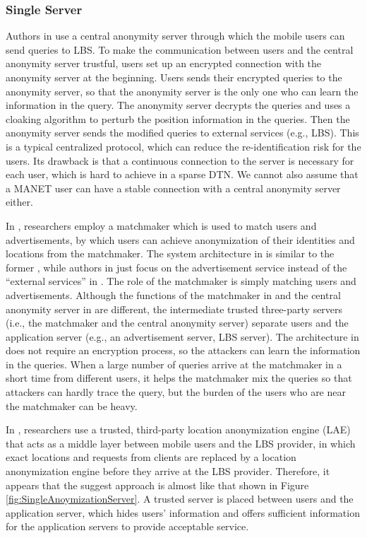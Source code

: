 \subsubsection{ Single Server}

\noindent Authors in \cite {C15} use a central anonymity server through which the mobile users can send queries to LBS. To make the communication between users and the central anonymity server trustful, users set up an encrypted connection with the anonymity server at the beginning. Users sends their encrypted queries to the anonymity server, so that the anonymity server is the only one who can learn the information in the query. The anonymity server decrypts the queries and uses a cloaking algorithm to perturb the position information in the queries. Then the anonymity server sends the modified queries to external services (e.g., LBS). This is a typical centralized protocol, which can reduce the re-identification risk for the users. Its drawback is that a continuous connection to the server is necessary for each user, which is hard to achieve in a sparse DTN. We cannot also assume that a MANET user can have a stable connection with a central anonymity server either.

In \cite {C23}, researchers employ a matchmaker which is used to match users and advertisements, by which users can achieve anonymization of their identities and locations from the matchmaker. The system architecture in \cite {C23} is similar to the former \cite {C15}, while authors in \cite {C23} just focus on the advertisement service instead of the ``external services'' in \cite{C15}. The role of the matchmaker is simply matching users and advertisements. Although the functions of the matchmaker in \cite {C23} and the central anonymity server in \cite {C15} are different, the intermediate trusted three-party servers (i.e., the matchmaker and the central anonymity server) separate users and the application server (e.g., an advertisement server, LBS server). The architecture in \cite {C23} does not require an encryption process, so the attackers can learn the information in the queries. When a large number of queries arrive at the matchmaker in a short time from different users, it helps the matchmaker mix the queries so that attackers can hardly trace the query, but the burden of the users who are near the matchmaker can be heavy.

In \cite {C24}, researchers use a trusted, third-party location anonymization engine (LAE) that acts as a middle layer between mobile users and the LBS provider, in which exact locations and requests from clients are replaced by a location anonymization engine before they arrive at the LBS provider. Therefore, it appears that the suggest approach is almost like that shown in Figure \ref{fig:SingleAnoymizationServer}. A trusted server is placed between users and the application server, which hides users' information and offers sufficient information for the application servers to provide acceptable service. 

